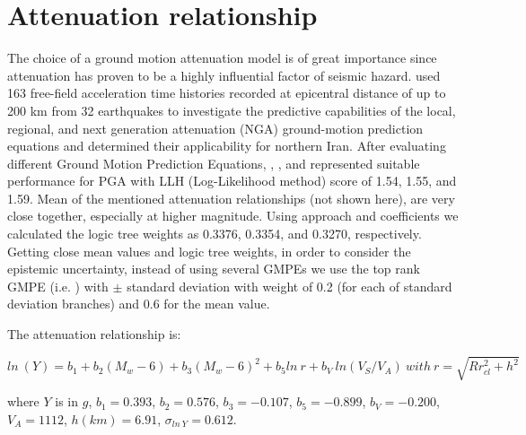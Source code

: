 \section{Attenuation relationship}
The choice of a ground motion attenuation model is of great importance since attenuation has proven to be a highly influential factor of seismic hazard. \citet{Zafarani2014} used 163 free-field acceleration time histories recorded at epicentral distance of up to 200 km from 32 earthquakes to investigate the predictive capabilities of the local, regional, and next generation attenuation (NGA) ground-motion prediction equations and determined their applicability for northern Iran. After evaluating different Ground Motion Prediction Equations, \citet{Kalkan2004}, \citet{Chiou2008}, and \citet{Boore2008} represented suitable performance for  PGA  with LLH (Log-Likelihood method) score of 1.54, 1.55, and 1.59. Mean of the mentioned attenuation relationships (not shown here), are very close together, especially at higher magnitude. Using \citet{Scherbaum2009} approach and \citet{Zafarani2014} coefficients we calculated the logic tree weights as 0.3376, 0.3354, and 0.3270, respectively. Getting close mean values and logic tree weights, in order to consider the epistemic uncertainty, instead of using several GMPEs we use the top rank GMPE (i.e.  \citet{Kalkan2004} ) with  $\pm$ standard deviation with weight of 0.2 (for each of standard deviation branches) and 0.6 for the mean value.    \\

\noindent

The attenuation relationship is:

\begin{equation}
ln\ (Y) = b_1 + b_2(M_w-6) + b_3( M_w-6)^{2}+ b_5ln\ r + b_V \ ln(V_S/V_A) \  with \  r= \sqrt{R{r^2_{cl} + h^2}}  
\end{equation}

where $Y$ is in $g$, $b_1 = 0.393$, $b_2 = 0.576$, $b_3 = -0.107$, $b_5 = -0.899$, $b_V = -0.200$, $V_A = 1112$, $h(km) = 6.91$, $\sigma_{ln\ Y} = 0.612$.



